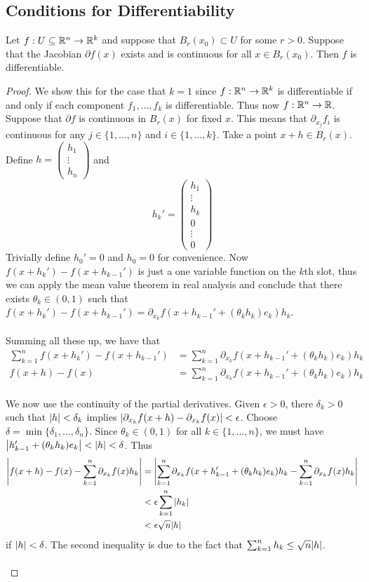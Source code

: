 \documentclass[a4paper]{article}
\begin{document}
\subsection{Conditions for Differentiability}
\begin{thm}{}{} Let $f:U\subseteq\mathbb{R}^n\to\mathbb{R}^k$ and suppose that $B_r(x_0)\subset U$ for some $r>0$. Suppose that the Jacobian $\partial f(x)$ exists and is continuous for all $x\in B_r(x_0)$. Then $f$ is differentiable. \tcbline
\begin{proof}
We show this for the case that $k=1$ since $f:\mathbb{R}^n\to\mathbb{R}^k$ is differentiable if and only if each component $f_1,\dots,f_k$ is differentiable. Thus now $f:\mathbb{R}^n\to\mathbb{R}$. Suppose that $\partial f$ is continuous in $B_r(x)$ for fixed $x$. This means that $\partial_{x_j}f_i$ is continuous for any $j\in\{1,\dots,n\}$ and $i\in\{1,\dots,k\}$. Take a point $x+h\in B_r(x)$. Define $h=\begin{pmatrix}
h_1\\ \vdots\\ h_n
\end{pmatrix}$ and $$h_k'=\begin{pmatrix}h_1\\\vdots\\ h_k\\0\\\vdots\\0\end{pmatrix}$$ Trivially define $h_0'=0$ and $h_0=0$ for convenience. Now $f(x+h_k')-f(x+h_{k-1}')$ is just a one variable function on the $k$th slot, thus we can apply the mean value theorem in real analysis and conclude that there exists $\theta_{k}\in(0,1)$ such that $f(x+h_k')-f(x+h_{k-1}')=\partial_{x_k}f(x+h_{k-1}'+(\theta_kh_k)e_k)h_k$. \\~\\
Summing all these up, we have that 
\begin{align*}
\sum_{k=1}^nf(x+h_k')-f(x+h_{k-1}')&=\sum_{k=1}^n\partial_{x_k}f(x+h_{k-1}'+(\theta_kh_k)e_k)h_k\\
f(x+h)-f(x)&=\sum_{k=1}^n\partial_{x_k}f(x+h_{k-1}'+(\theta_kh_k)e_k)h_k
\end{align*}~\\

We now use the continuity of the partial derivatives. Given $\epsilon>0$, there $\delta_k>0$ such that $\abs{h}<\delta_k$ implies $\abs{\partial_{x_k}f(x+h)-\partial_{x_k}f(x)}<\epsilon$. Choose $\delta=\min\{\delta_1,\dots,\delta_n\}$. Since $\theta_k\in(0,1)$ for all $k\in\{1,\dots,n\}$, we must have $\abs{h_{k-1}'+(\theta_kh_k)e_k}<\abs{h}<\delta$. Thus
\begin{align*}
\abs{f(x+h)-f(x)-\sum_{k=1}^n\partial_{x_k}f(x)h_k}&=\abs{\sum_{k=1}^n\partial_{x_k}f(x+h_{k-1}'+(\theta_kh_k)e_k)h_k-\sum_{k=1}^n\partial_{x_k}f(x)h_k}\\
&<\epsilon\sum_{k=1}^n\abs{h_k}\\
&<\epsilon\sqrt{n}\abs{h}
\end{align*}
if $\abs{h}<\delta$. The second inequality is due to the fact that $\sum_{k=1}^nh_k\leq\sqrt{n}\abs{h}$. \\~\\


\end{proof}
\end{thm}
\end{document}
